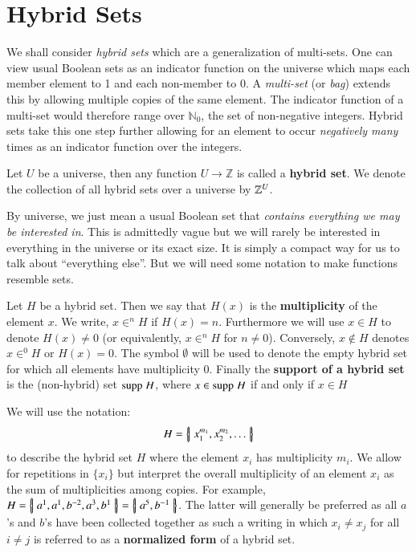 \section{Hybrid Sets}


We shall consider \emph{hybrid sets} which are a generalization of multi-sets.
One can view usual Boolean sets as an indicator function on the universe
which maps each member element to 1 and each non-member to 0.
A \emph{multi-set} (or \emph{bag}) extends this by allowing multiple copies of the same element.
The indicator function of a multi-set would therefore range over $\mathbb{N}_0$, the set of non-negative integers.
Hybrid sets take this one step further allowing for an element to occur \emph{negatively many} times 
as an indicator function over the integers.


\begin{definition}
	Let $U$ be a universe, then any function $U \to \mathbb{Z}$ is called a \textbf{hybrid set}.
	We denote the collection of all hybrid sets over a universe by $\hsetover[U]$.
\end{definition}


By universe, we just mean a usual Boolean set that \emph{contains everything we may be interested in}.
This is admittedly vague but we will rarely be interested in everything in the universe or its exact size.
It is simply a compact way for us to talk about ``everything else''.
But we will need some notation to make functions resemble sets.


\begin{definition}
	Let $H$ be a hybrid set. 
	Then we say that $H(x)$ is the \textbf{multiplicity} of the element $x$. 
	We write, $x \in^n H$ if $H(x)=n$. 
	Furthermore we will use $x \in H$ to denote $H(x)\neq 0$ (or equivalently, $x \in^n H$ for $n\neq 0$).
	Conversely, $x \notin H$ denotes $x \in^0 H$ or $H(x)=0$.
	The symbol $\emptyset$ will be used to denote the empty hybrid set for which all elements have multiplicity 0.
	Finally the \textbf{support of a hybrid set} is the (non-hybrid) set $\text{supp}\;H$,
	where $x \in \text{supp}\;H$ if and only if $x \in H$
\end{definition}


We will use the notation:
\begin{equation*}
	H = \left\{ \! \left| \; x_1^{m_1}, x_2^{m_2},\ldots \; \right| \! \right\}
\end{equation*}
to describe the hybrid set $H$ where the element $x_i$ has multiplicity $m_i$. 
We allow for repetitions in $\{ x_i \}$ but interpret the overall multiplicity of an element $x_i$ as 
the sum of multiplicities among copies. 
For example, $H=\left\{ \! \left| \; a^1, a^1, b^{-2}, a^3, b^1 \; \right| \! \right\} = \left\{ \! \left| \; a^5, b^{-1} \; \right| \! \right\}$. 
The latter will generally be preferred as all $a$'s and $b$'s have been collected together as such
a writing in which $x_i \neq x_j$ for all $i \neq j$ is referred to as a \textbf{normalized form} of a hybrid set. 


